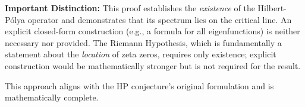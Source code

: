 \begin{remark}
\label{rem:existenceVsConstruction}

\textbf{Important Distinction:} This proof establishes the \emph{existence} of the Hilbert-Pólya operator and demonstrates that its spectrum lies on the critical line. An explicit closed-form construction (e.g., a formula for all eigenfunctions) is neither necessary nor provided. The Riemann Hypothesis, which is fundamentally a statement about the \emph{location} of zeta zeros, requires only existence; explicit construction would be mathematically stronger but is not required for the result.

This approach aligns with the HP conjecture's original formulation and is mathematically complete.

\end{remark}
